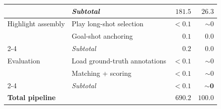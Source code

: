 \begin{table}[!tbp]
\begin{tabular}{llrr}
 & \textit{Subtotal} & $\mathbf{181.5}$ & $\mathbf{26.3}$ \\
\midrule
Highlight assembly & Play long-shot selection & $< 0.1$ & $\sim 0$ \\
 & Goal-shot anchoring & $0.1$ & $0.0$ \\
\cmidrule(lr){2-4}
 & \textit{Subtotal} & $\mathbf{0.2}$ & $\mathbf{0.0}$ \\
\midrule
Evaluation & Load ground-truth annotations & $< 0.1$ & $\sim 0$ \\
 & Matching + scoring & $< 0.1$ & $\sim 0$ \\
\cmidrule(lr){2-4}
 & \textit{Subtotal} & $\mathbf{< 0.1}$ & $\mathbf{\sim 0}$ \\
\midrule
\multicolumn{2}{l}{\textbf{Total pipeline}} & $\mathbf{690.2}$ & $\mathbf{100.0}$ \\
\bottomrule
\end{tabular}
\end{table}

